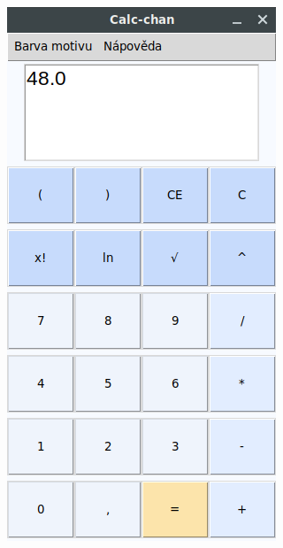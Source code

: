 \documentclass[a4paper, 11pt]{article}
\begin{document}
\hspace{10pt}
\includegraphics[scale=0.5]{calc3.png}
\newpage
\end{document}
